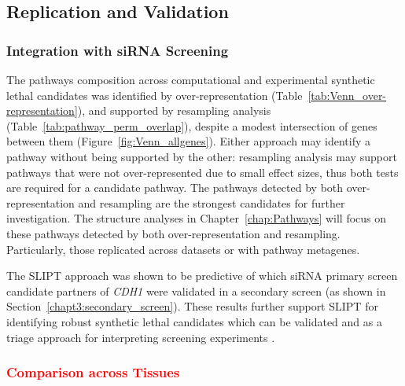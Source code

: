 \subsection{Replication and Validation}

\subsubsection{Integration with siRNA Screening}

The \glspl{pathway} composition across computational and experimental \gls{synthetic lethal} candidates was identified by over-represent\-ation (Table~\ref{tab:Venn_over-representation}), and supported by resampling analysis (Table~\ref{tab:pathway_perm_overlap}), despite a modest intersection of genes between them (Figure~\ref{fig:Venn_allgenes}). Either approach may identify a \gls{pathway} without being supported by the other: resampling analysis may support \glspl{pathway} that were not over-represent\-ed due to small effect sizes, thus both tests are required for a candidate \gls{pathway}.
%
The \glspl{pathway} detected by both over-represent\-ation and resampling are the strongest candidates for further investigation. The  structure analyses in Chapter~\ref{chap:Pathways} will focus on these \glspl{pathway} detected by both over-representation and resampling. Particularly, those replicated across datasets or with \gls{pathway} \glspl{metagene}. %

The \gls{SLIPT} approach was shown to be predictive of which \gls{siRNA} primary screen candidate partners of \textit{CDH1} were validated in a secondary screen (as shown in Section~\ref{chapt3:secondary_screen}). These results further support \gls{SLIPT} for identifying robust \gls{synthetic lethal} candidates which can be validated and as a triage approach for interpreting screening experiments \citep{ONeil2017}.

\subsubsection{\textcolor{red}{Comparison across Tissues}}

